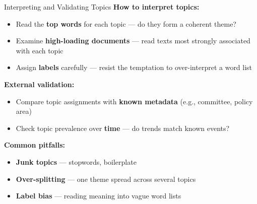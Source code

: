 \documentclass[aspectratio=169]{beamer}
\begin{document}
\begin{frame}{Interpreting and Validating Topics}
    \small
    \textbf{How to interpret topics:}
    \begin{itemize}\setlength\itemsep{0pt}
        \item {} Read the \textbf{top words} for each topic --- do they form a coherent theme?
        \item {} Examine \textbf{high-loading documents} --- read texts most strongly associated with each topic
        \item {} Assign \textbf{labels} carefully --- resist the temptation to over-interpret a word list
    \end{itemize}

    \vspace{0.2cm}
    \textbf{External validation:}
    \begin{itemize}\setlength\itemsep{0pt}
        \item Compare topic assignments with \textbf{known metadata} (e.g., committee, policy area)
        \item Check topic prevalence over \textbf{time} --- do trends match known events?
    \end{itemize}

    \vspace{0.2cm}
    \textbf{Common pitfalls:}
    \begin{itemize}\setlength\itemsep{0pt}
        \item {} \textbf{Junk topics} --- stopwords, boilerplate
        \item {} \textbf{Over-splitting} --- one theme spread across several topics
        \item {} \textbf{Label bias} --- reading meaning into vague word lists
    \end{itemize}
\end{frame}
\end{document}
